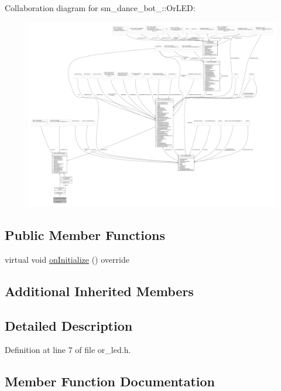 Collaboration diagram for sm\+\_\+dance\+\_\+bot\+\_\+:\+:Or\+L\+ED\+:
\nopagebreak
\begin{figure}[H]
\begin{center}
\leavevmode
\includegraphics[width=350pt]{classsm__dance__bot__2_1_1OrLED__coll__graph}
\end{center}
\end{figure}
\subsection*{Public Member Functions}
\begin{DoxyCompactItemize}
\item 
virtual void \hyperlink{classsm__dance__bot__2_1_1OrLED_a198f79e0ede660278da88e0731a29303}{on\+Initialize} () override
\end{DoxyCompactItemize}
\subsection*{Additional Inherited Members}


\subsection{Detailed Description}


Definition at line 7 of file or\+\_\+led.\+h.



\subsection{Member Function Documentation}
\mbox{\label{classsm__dance__bot__2_1_1OrLED_a198f79e0ede660278da88e0731a29303}} 
